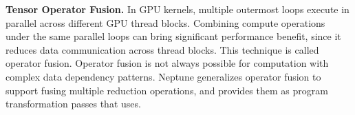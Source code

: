 \textbf{Tensor Operator Fusion.}
In GPU kernels, multiple outermost loops execute in parallel across different GPU thread blocks.
Combining compute operations under the same parallel loops can bring significant
performance benefit,
since it reduces data communication across thread blocks. This technique is called operator fusion.
Operator fusion is not always possible for computation with complex data dependency patterns.
Neptune generalizes operator fusion to support fusing multiple reduction operations,
and provides them as program transformation passes that \NAME{} uses.

